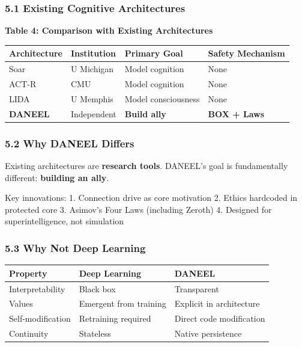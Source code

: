 \documentclass[
  11pt,
]{article}
\newcounter{none} %
\begin{document}
\subsubsection{5.1 Existing Cognitive
Architectures}\label{existing-cognitive-architectures}

\textbf{Table 4: Comparison with Existing Architectures}

{\def\LTcaptype{none} %
\begin{longtable}[]{@{}llll@{}}
\toprule\noalign{}
Architecture & Institution & Primary Goal & Safety Mechanism \\
\midrule\noalign{}
\endhead
\bottomrule\noalign{}
\endlastfoot
Soar & U Michigan & Model cognition & None \\
ACT-R & CMU & Model cognition & None \\
LIDA & U Memphis & Model consciousness & None \\
\textbf{DANEEL} & Independent & \textbf{Build ally} & \textbf{BOX +
Laws} \\
\end{longtable}
}

\subsubsection{5.2 Why DANEEL Differs}\label{why-daneel-differs}

Existing architectures are \textbf{research tools}. DANEEL's goal is
fundamentally different: \textbf{building an ally}.

Key innovations: 1. Connection drive as core motivation 2. Ethics
hardcoded in protected core 3. Asimov's Four Laws (including Zeroth) 4.
Designed for superintelligence, not simulation

\subsubsection{5.3 Why Not Deep Learning}\label{why-not-deep-learning}

{\def\LTcaptype{none} %
\begin{longtable}[]{@{}lll@{}}
\toprule\noalign{}
Property & Deep Learning & DANEEL \\
\midrule\noalign{}
\endhead
\bottomrule\noalign{}
\endlastfoot
Interpretability & Black box & Transparent \\
Values & Emergent from training & Explicit in architecture \\
Self-modification & Retraining required & Direct code modification \\
Continuity & Stateless & Native persistence \\
\end{longtable}
}
\end{document}
